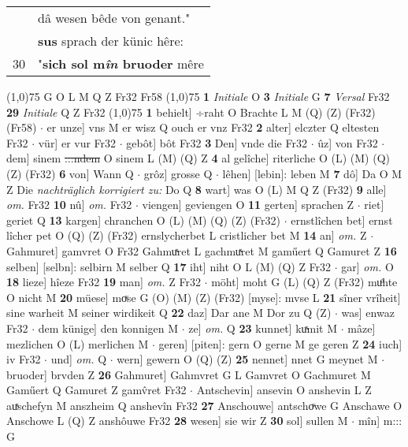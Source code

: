\documentclass[8pt,a4paper,notitlepage]{article}
\begin{document}
\begin{table}[ht]
\begin{minipage}[t]{0.5\linewidth}
\begin{tabular}{rl}
 & dâ wesen bêde von genant."\\ 
 & \textbf{sus} sprach der künic hêre:\\ 
30 & "\textbf{sich sol m\textit{în} bruoder} mêre\\ 
\end{tabular}
\scriptsize
\line(1,0){75} \newline
G O L M Q Z Fr32 Fr58 \newline
\line(1,0){75} \newline
\textbf{1} \textit{Initiale} O  \textbf{3} \textit{Initiale} G  \textbf{7} \textit{Versal} Fr32  \textbf{29} \textit{Initiale} Q Z Fr32  \newline
\line(1,0){75} \newline
\textbf{1} behielt] ÷raht O Brachte L M (Q) (Z) (Fr32) (Fr58)  $\cdot$ er unze] vns M er wisz Q ouch er vnz Fr32 \textbf{2} alter] elczter Q eltesten Fr32  $\cdot$ vür] er vur Fr32  $\cdot$ gebôt] bôt Fr32 \textbf{3} Den] vnde die Fr32  $\cdot$ ûz] von Fr32  $\cdot$ dem] sinem \sout{:::ndem} O sinem L (M) (Q) Z \textbf{4} al gelîche] riterliche O (L) (M) (Q) (Z) (Fr32) \textbf{6} von] Wann Q  $\cdot$ grôz] grosse Q  $\cdot$ lêhen] [lebin]: leben M \textbf{7} dô] Da O M Z Die \textit{nachträglich korrigiert zu:} Do Q \textbf{8} wart] was O (L) M Q Z (Fr32) \textbf{9} alle] \textit{om.} Fr32 \textbf{10} nû] \textit{om.} Fr32  $\cdot$ viengen] geviengen O \textbf{11} gerten] sprachen Z  $\cdot$ riet] geriet Q \textbf{13} kargen] chranchen O (L) (M) (Q) (Z) (Fr32)  $\cdot$ ernstlîchen bet] ernst lîcher pet O (Q) (Z) (Fr32) ernslycherbet L cristlicher bet M \textbf{14} an] \textit{om.} Z  $\cdot$ Gahmuret] gamvret O Fr32 Gahmuͯret L gachmuͯret M gaműert Q Gamuret Z \textbf{16} selben] [selbn]: selbirn M selber Q \textbf{17} iht] niht O L (M) (Q) Z Fr32  $\cdot$ gar] \textit{om.} O \textbf{18} lieze] hîeze Fr32 \textbf{19} man] \textit{om.} Z Fr32  $\cdot$ möht] moht G (L) (Q) Z (Fr32) muͦhte O nicht M \textbf{20} müese] moͮse G (O) (M) (Z) (Fr32) [myse]: mvse  L \textbf{21} sîner vrîheit] sine warheit M seiner wirdikeit Q \textbf{22} daz] Dar ane M Dor zu Q (Z)  $\cdot$ was] enwaz Fr32  $\cdot$ dem künige] den konnigen M  $\cdot$ ze] \textit{om.} Q \textbf{23} kunnet] kuͯmit M  $\cdot$ mâze] mezlichen O (L) merlichen M  $\cdot$ geren] [piten]: gern O gerne M ge geren Z \textbf{24} iuch] iv Fr32  $\cdot$ und] \textit{om.} Q  $\cdot$ wern] gewern O (Q) (Z) \textbf{25} nennet] nnet G meynet M  $\cdot$ bruoder] brvden Z \textbf{26} Gahmuret] Gahmvret G L Gamvret O Gachmuret M Gaműert Q Gamuret Z gamv̂ret Fr32  $\cdot$ Antschevin] ansevin O anshevin L Z auͯschefyn M anszheim Q anshevîn Fr32 \textbf{27} Anschouwe] antschoͮwe G Anschawe O Anschowe L (Q) Z anshôuwe Fr32 \textbf{28} wesen] sie wir Z \textbf{30} sol] sullen M  $\cdot$ mîn] m::: G \newline

\end{minipage}
\end{table}
\end{document}
